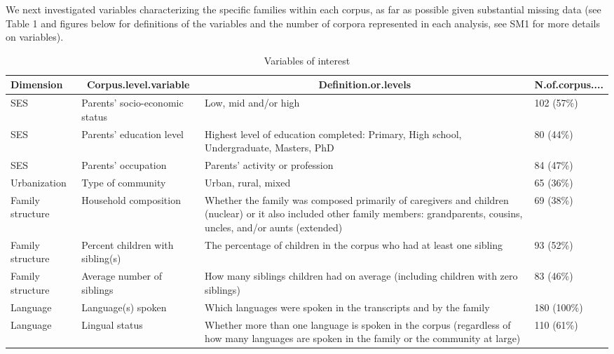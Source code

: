 \documentclass[
  man,floatsintext]{apa6}
\begin{document}
We next investigated variables characterizing the specific families within each corpus, as far as possible given substantial missing data (see Table 1 and figures below for definitions of the variables and the number of corpora represented in each analysis, see SM1 for more details on variables).

\begin{table}[tbp]

\begin{center}
\begin{threeparttable}

\caption{\label{tab:tab1}Variables of interest}

\begin{tabular}{llll}
\toprule
Dimension & \multicolumn{1}{c}{Corpus.level.variable} & \multicolumn{1}{c}{Definition.or.levels} & \multicolumn{1}{c}{N.of.corpus....}\\
\midrule
SES & Parents' socio-economic status & Low, mid and/or high & 102 (57\%)\\
SES & Parents' education level & Highest level of education completed: Primary, High school, Undergraduate, Masters, PhD & 80 (44\%)\\
SES & Parents' occupation & Parents' activity or profession & 84 (47\%)\\
Urbanization & Type of community & Urban, rural, mixed & 65 (36\%)\\
Family structure & Household composition & Whether the family was composed primarily of caregivers and children (nuclear) or it also included other family members: grandparents, cousins, uncles, and/or aunts (extended) & 69 (38\%)\\
Family structure & Percent children with sibling(s) & The percentage of children in the corpus who had at least one sibling & 93 (52\%)\\
Family structure & Average number of siblings & How many siblings children had on average (including children with zero siblings) & 83 (46\%)\\
Language & Language(s) spoken & Which languages were spoken in the transcripts and by the family & 180 (100\%)\\
Language & Lingual status & Whether more than one language is spoken in the corpus (regardless of how many languages are spoken in the family or the community at large) & 110 (61\%)\\
\bottomrule
\end{tabular}

\end{threeparttable}
\end{center}

\end{table}
\end{document}
